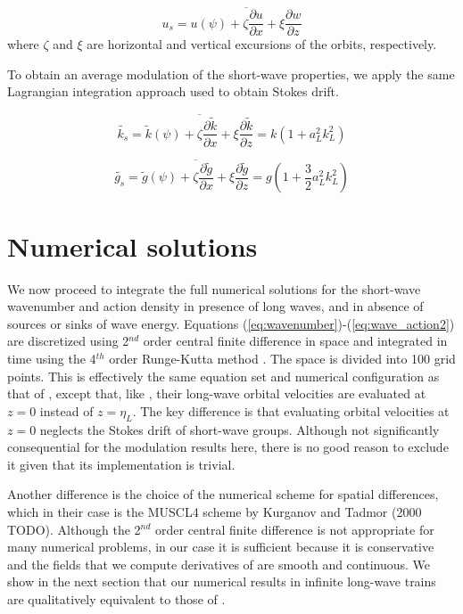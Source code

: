 \documentclass[draft]{agujournal2019}
\begin{document}
\begin{equation}
\label{eq:lagrangian_average}
u_s = \overline{
  u(\psi) + 
  \zeta \dfrac{\partial u}{\partial x} +
  \xi \dfrac{\partial w}{\partial z}
}
\end{equation}
where $\zeta$ and $\xi$ are horizontal and vertical excursions of the orbits,
respectively.

To obtain an average modulation of the short-wave properties, we apply the same
Lagrangian integration approach used to obtain Stokes drift.

\begin{equation}
\label{eq:stokes_wavenumber}
\widetilde{k_s} = \overline{
  \widetilde{k}(\psi) +
  \zeta \dfrac{\partial \widetilde{k}}{\partial x} +
  \xi \dfrac{\partial \widetilde{k}}{\partial z}
}
= k \left( 1 + a_L^2 k_L^2 \right)
\end{equation}

\begin{equation}
\label{eq:stokes_gravity}
\widetilde{g_s} = \overline{
  \widetilde{g}(\psi) +
  \zeta \dfrac{\partial \widetilde{g}}{\partial x} +
  \xi \dfrac{\partial \widetilde{g}}{\partial z}
}
= g \left( 1 + \dfrac{3}{2} a_L^2 k_L^2 \right)
\end{equation}

\section{Numerical solutions}
\label{section:numerical_solutions}

We now proceed to integrate the full numerical solutions for the short-wave
wavenumber and action density in presence of long waves, and in absence of
sources or sinks of wave energy.
Equations (\ref{eq:wavenumber})-(\ref{eq:wave_action2}) are discretized using
2$^{nd}$  order central finite difference in space and integrated in time using the
4$^{th}$ order Runge-Kutta method \cite{butcher1996runge}.
The space is divided into 100 grid points.
This is effectively the same equation set and numerical configuration as that of
, except that, like , their
long-wave orbital velocities are evaluated at $z=0$ instead of $z=\eta_L$.
The key difference is that evaluating orbital velocities at $z=0$ neglects the
Stokes drift of short-wave groups.
Although not significantly consequential for the modulation results here, there
is no good reason to exclude it given that its implementation is trivial.

Another difference is the choice of the numerical scheme for spatial differences,
which in their case is the MUSCL4 scheme by Kurganov and Tadmor (2000 TODO).
Although the 2$^{nd}$ order central finite difference is not appropriate for many
numerical problems, in our case it is sufficient because it is conservative and
the fields that we compute derivatives of are smooth and continuous.
We show in the next section that our numerical results in infinite long-wave
trains are qualitatively equivalent to those of .
\end{document}
